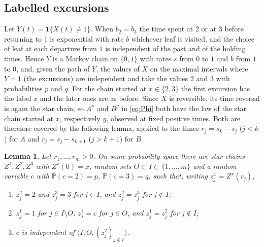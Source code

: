\documentclass[11pt]{amsart}
\newtheorem{lemma}[theorem]{Lemma}
\theoremstyle{remark}
\numberwithin{equation}{section}
\newcommand{\Pp}{\mathbb P}
\newcommand{\1}{\mathbf 1}
\begin{document}
\subsection{Labelled excursions}
Let $Y(t)=\1\{X(t)\ne1\}$. When $b_2=b_3$ the time spent at $2$ or at $3$ before returning to $1$ is exponential with rate $b$ whichever leaf is visited, and the choice of leaf at each departure from $1$ is independent of the past and of the holding times. Hence $Y$ is a Markov chain on $\{0,1\}$ with rates $s$ from $0$ to $1$ and $b$ from $1$ to $0$, and, given the path of $Y$, the values of $X$ on the maximal intervals where $Y=1$ (the excursions) are independent and take the values $2$ and $3$ with probabilities $p$ and $q$. For the chain started at $x\in\{2,3\}$ the first excursion has the label $x$ and the later ones are as before. Since $X$ is reversible, its time reversal is again the star chain, so $A^x$ and $B^y$ in \eqref{eq:Phi} both have the law of the star chain started at $x$, respectively $y$, observed at fixed positive times. Both are therefore covered by the following lemma, applied to the times $r_j=s_k-s_j$ ($j<k$) for $A$ and $r_j=s_j-s_{k+1}$ ($j>k+1$) for $B$.

\begin{lemma}\label{lem:coupling}
Let $r_1,\dots,r_m>0$. On some probability space there are star chains $Z^1,Z^2,Z^3$ with $Z^x(0)=x$, random sets $O\subset I\subset\{1,\dots,m\}$ and a random variable $c$ with $\Pp(c=2)=p$, $\Pp(c=3)=q$, such that, writing $z^x_j=Z^x(r_j)$,
\begin{enumerate}[label=\textup{(\roman*)},leftmargin=*]
\item $z^2_j=2$ and $z^3_j=3$ for $j\in I$, and $z^2_j=z^3_j$ for $j\notin I$;
\item $z^1_j=1$ for $j\in I\setminus O$, $z^1_j=c$ for $j\in O$, and $z^1_j=z^2_j$ for $j\notin I$;
\item $c$ is independent of $\bigl(I,O,(z^2_j)_{j\notin I}\bigr)$.
\end{enumerate}
\end{lemma}
\end{document}
